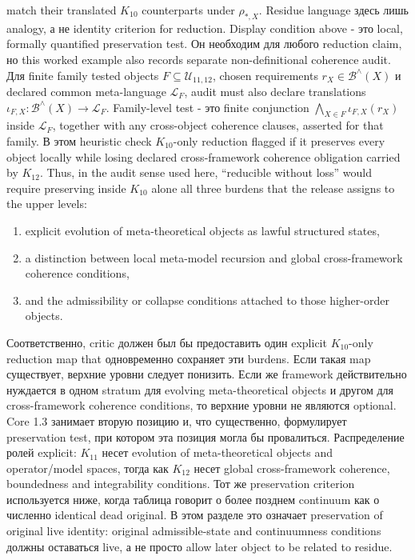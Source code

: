 match their translated \(K_{10}\) counterparts under \(\rho_{\ast,X}\).
Residue language здесь лишь analogy, а не identity criterion for reduction.
Display condition above - это local, formally quantified preservation test.
Он необходим для любого reduction claim, но this worked example also records
separate non-definitional coherence audit. Для finite family tested objects
\(F\subseteq\mathcal{U}_{11,12}\), chosen requirements \(r_X\in
\mathcal{B}^{\wedge}(X)\) и declared common meta-language \(\mathcal{L}_F\),
audit must also declare translations \(\iota_{F,X}:\mathcal{B}^{\wedge}(X)\to\mathcal{L}_F\).
Family-level test - это finite conjunction \(\bigwedge_{X\in F}\iota_{F,X}(r_X)\)
inside \(\mathcal{L}_F\), together with any cross-object coherence clauses,
asserted for that family. В этом heuristic check \(K_{10}\)-only reduction
flagged if it preserves every object locally while losing declared
cross-framework coherence obligation carried by \(K_{12}\). Thus, in the
audit sense used here, ``reducible without loss'' would require preserving
inside \(K_{10}\) alone all three burdens that the release assigns to the
upper levels:
\begin{enumerate}
\item explicit evolution of meta-theoretical objects as lawful structured
      states,
\item a distinction between local meta-model recursion and global
      cross-framework coherence conditions,
\item and the admissibility or collapse conditions attached to those
      higher-order objects.
\end{enumerate}
Соответственно, critic должен был бы предоставить один explicit
\(K_{10}\)-only reduction map that одновременно сохраняет эти burdens. Если
такая map существует, верхние уровни следует понизить. Если же framework
действительно нуждается в одном stratum для evolving meta-theoretical objects
и другом для cross-framework coherence conditions, то верхние уровни не
являются optional. Core 1.3 занимает вторую позицию и, что существенно,
формулирует preservation test, при котором эта позиция могла бы провалиться.
Распределение ролей explicit: \(K_{11}\) несет evolution of
meta-theoretical objects and operator/model spaces, тогда как \(K_{12}\)
несет global cross-framework coherence, boundedness and integrability
conditions. Тот же preservation criterion используется ниже, когда таблица
говорит о более позднем continuum как о численно identical dead original. В
этом разделе это означает preservation of original live identity: original
admissible-state and continuumness conditions должны оставаться live, а не
просто allow later object to be related to residue.

